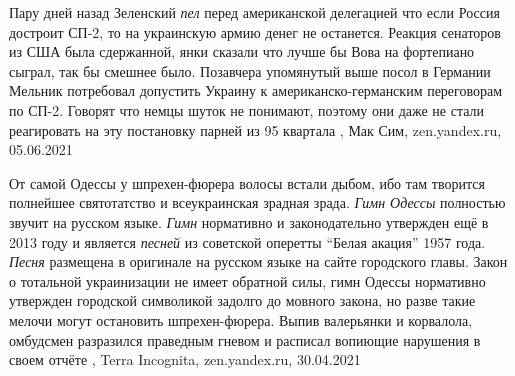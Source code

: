 Пару дней назад Зеленский \emph{пел} перед американской делегацией что если
Россия достроит СП-2, то на украинскую армию денег не останется. Реакция
сенаторов из США была сдержанной, янки сказали что лучше бы Вова на фортепиано
сыграл, так бы смешнее было.  Позавчера упомянутый выше посол в Германии
Мельник потребовал допустить Украину к американско-германским переговорам по
СП-2. Говорят что немцы шуток не понимают, поэтому они даже не стали
реагировать на эту постановку парней из 95 квартала
, 
Мак Сим, zen.yandex.ru, 05.06.2021

От самой Одессы у шпрехен-фюрера волосы встали дыбом, ибо там творится
полнейшее святотатство и всеукраинская зрадная зрада. \emph{Гимн Одессы} полностью
звучит на русском языке. \emph{Гимн} нормативно и законодательно утвержден ещё в 2013
году и является \emph{песней} из советской оперетты \enquote{Белая акация} 1957 года. \emph{Песня}
размещена в оригинале на русском языке на сайте городского главы.  Закон о
тотальной украинизации не имеет обратной силы, гимн Одессы нормативно утвержден
городской символикой задолго до мовного закона, но разве такие мелочи могут
остановить шпрехен-фюрера. Выпив валерьянки и корвалола, омбудсмен разразился
праведным гневом и расписал вопиющие нарушения в своем отчёте
, 
Terra Incognita, zen.yandex.ru, 30.04.2021
